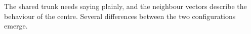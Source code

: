 The shared trunk needs saying plainly, and the neighbour vectors describe the
behaviour of the centre. Several differences between the two configurations emerge.
